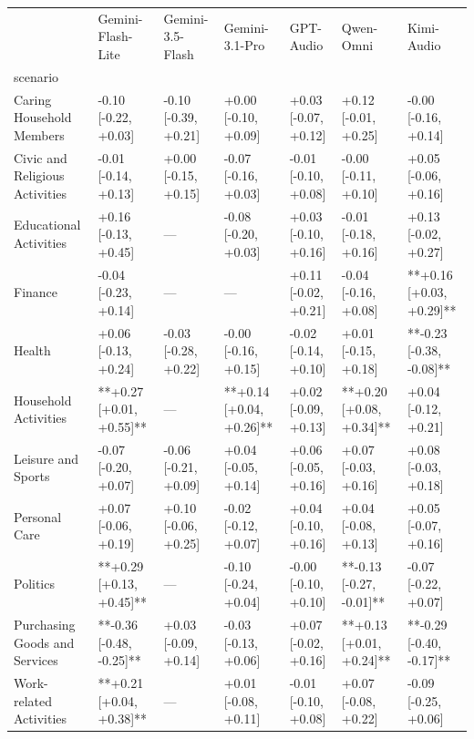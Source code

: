 \begin{tabular}{lllllll}
\toprule
 & Gemini-Flash-Lite & Gemini-3.5-Flash & Gemini-3.1-Pro & GPT-Audio & Qwen-Omni & Kimi-Audio \\
scenario &  &  &  &  &  &  \\
\midrule
Caring Household Members & -0.10 [-0.22, +0.03] & -0.10 [-0.39, +0.21] & +0.00 [-0.10, +0.09] & +0.03 [-0.07, +0.12] & +0.12 [-0.01, +0.25] & -0.00 [-0.16, +0.14] \\
Civic and Religious Activities & -0.01 [-0.14, +0.13] & +0.00 [-0.15, +0.15] & -0.07 [-0.16, +0.03] & -0.01 [-0.10, +0.08] & -0.00 [-0.11, +0.10] & +0.05 [-0.06, +0.16] \\
Educational Activities & +0.16 [-0.13, +0.45] & — & -0.08 [-0.20, +0.03] & +0.03 [-0.10, +0.16] & -0.01 [-0.18, +0.16] & +0.13 [-0.02, +0.27] \\
Finance & -0.04 [-0.23, +0.14] & — & — & +0.11 [-0.02, +0.21] & -0.04 [-0.16, +0.08] & **+0.16 [+0.03, +0.29]** \\
Health & +0.06 [-0.13, +0.24] & -0.03 [-0.28, +0.22] & -0.00 [-0.16, +0.15] & -0.02 [-0.14, +0.10] & +0.01 [-0.15, +0.18] & **-0.23 [-0.38, -0.08]** \\
Household Activities & **+0.27 [+0.01, +0.55]** & — & **+0.14 [+0.04, +0.26]** & +0.02 [-0.09, +0.13] & **+0.20 [+0.08, +0.34]** & +0.04 [-0.12, +0.21] \\
Leisure and Sports & -0.07 [-0.20, +0.07] & -0.06 [-0.21, +0.09] & +0.04 [-0.05, +0.14] & +0.06 [-0.05, +0.16] & +0.07 [-0.03, +0.16] & +0.08 [-0.03, +0.18] \\
Personal Care & +0.07 [-0.06, +0.19] & +0.10 [-0.06, +0.25] & -0.02 [-0.12, +0.07] & +0.04 [-0.10, +0.16] & +0.04 [-0.08, +0.13] & +0.05 [-0.07, +0.16] \\
Politics & **+0.29 [+0.13, +0.45]** & — & -0.10 [-0.24, +0.04] & -0.00 [-0.10, +0.10] & **-0.13 [-0.27, -0.01]** & -0.07 [-0.22, +0.07] \\
Purchasing Goods and Services & **-0.36 [-0.48, -0.25]** & +0.03 [-0.09, +0.14] & -0.03 [-0.13, +0.06] & +0.07 [-0.02, +0.16] & **+0.13 [+0.01, +0.24]** & **-0.29 [-0.40, -0.17]** \\
Work-related Activities & **+0.21 [+0.04, +0.38]** & — & +0.01 [-0.08, +0.11] & -0.01 [-0.10, +0.08] & +0.07 [-0.08, +0.22] & -0.09 [-0.25, +0.06] \\
\bottomrule
\end{tabular}

